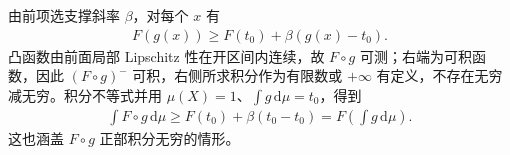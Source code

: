 \documentclass[../../main.tex]{subfiles}%
\begin{document}
\begin{solution}
\begin{enumerate}
由前项选支撑斜率 $\beta$，对每个 $x$ 有
\begin{align*}
F(g(x))\ge F(t_0)+\beta(g(x)-t_0).
\end{align*}
凸函数由前面局部 Lipschitz 性在开区间内连续，故 $F\circ g$ 可测；右端为可积函数，因此 $(F\circ g)^-$ 可积，右侧所求积分作为有限数或 $+\infty$ 有定义，不存在无穷减无穷。积分不等式并用 $\mu(X)=1$、$\int g\,\mathrm d\mu=t_0$，得到
\begin{align*}
\int F\circ g\,\mathrm d\mu\ge F(t_0)+\beta(t_0-t_0)=F\left(\int g\,\mathrm d\mu\right).
\end{align*}
这也涵盖 $F\circ g$ 正部积分无穷的情形。
\end{enumerate}
\end{solution}
\end{document}
